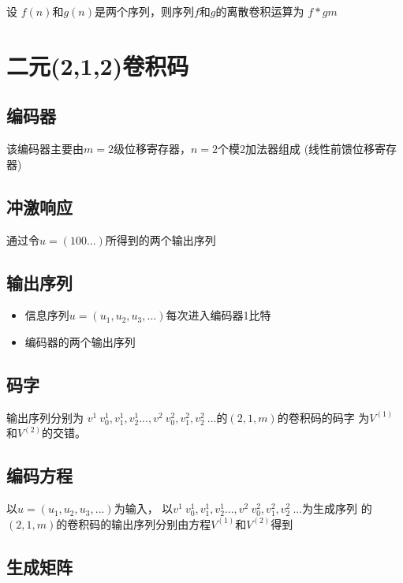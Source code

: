 \documentclass[onecolumn,oneside]{BUPTHomework}
\begin{document}
  设 $f(n)$和$g(n)$是两个序列，则序列$f$和$g$的离散卷积运算为 $f*g m$

  \section*{二元(2,1,2)卷积码}

  \subsection*{编码器}

  该编码器主要由$m=2$级位移寄存器，$n=2$个模2加法器组成 (线性前馈位移寄存器)

  \subsection*{冲激响应}

  通过令$u=(100...)$所得到的两个输出序列

  \subsection*{输出序列}

  \begin{itemize}
    \item 信息序列$u=(u_1,u_2,u_3,...)$每次进入编码器1比特
    \item 编码器的两个输出序列
  \end{itemize}

  \subsection*{码字}

  输出序列分别为 $v^1\ v^1_0,v^1_1,v^1_2...,v^2\ v^2_0,v^2_1,v^2_2\ ...$的$(2,1,m)$的卷积码的码字
  为$V^{(1)}$和$V^{(2)}$的交错。
  
  \subsection*{编码方程}

  以$u=(u_1,u_2,u_3,...)$为输入，
  以$v^1\ v^1_0,v^1_1,v^1_2...,v^2\ v^2_0,v^2_1,v^2_2\ ...$为生成序列
  的$(2,1,m)$的卷积码的输出序列分别由方程$V^{(1)}$和$V^{(2)}$得到

  \subsection*{生成矩阵}
\end{document}
